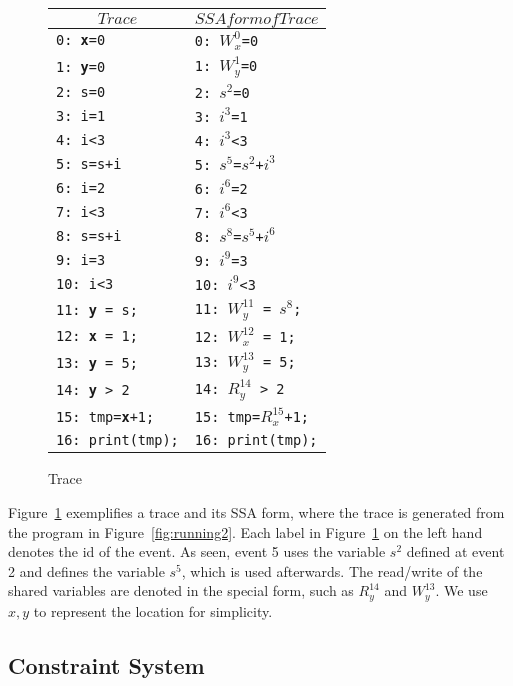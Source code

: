  
\begin{figure}
\centering
\begin{tabular}{l|l}
\hline
\multicolumn{1}{c}{$Trace$} & \multicolumn{1}{c}{$SSA form of  Trace$} \\
\hline
{\tt 0: {\bf x}=0} &  {\tt 0: $W^0_x$=0}    \\
{\tt 1: {\bf y}=0} &   {\tt 1: $W^1_y$=0}   \\
{\tt 2: s=0} &  {\tt 2: $s^2$=0}   \\
{\tt 3: i=1} &     {\tt 3: $i^3$=1}   \\
{\tt 4: i<3} &    {\tt 4: $i^3$<3} \\
{\tt 5: s=s+i} & {\tt 5: $s^5$=$s^2$+$i^3$}   \\
{\tt 6: i=2} &       {\tt 6: $i^6$=2}  \\
{\tt 7: i<3} &      {\tt 7: $i^6$<3}  \\
{\tt 8: s=s+i} &  {\tt 8: $s^8$=$s^5$+$i^6$}  \\
{\tt 9: i=3} &     {\tt 9: $i^9$=3}  \\
{\tt 10: i<3} &    {\tt 10: $i^9$<3}  \\
{\tt 11: {\bf y} = s;} &  {\tt 11: $W^{11}_y$ = $s^8$;}  \\
{\tt 12: {\bf x} = 1;} &    {\tt 12: $W^{12}_x$ = 1;}   \\
{\tt 13: {\bf y} = 5;} &    {\tt 13: $W^{13}_y$ = 5;}  \\
{\tt 14: {\bf y} > 2}  &    {\tt 14: $R^{14}_y$ > 2} \\
{\tt 15: tmp={\bf x}+1;}  & {\tt 15: tmp=$R^{15}_x$+1;}   \\	
{\tt 16: print(tmp);} &  {\tt 16: print(tmp);}  \\
\end{tabular}
\caption{Trace}
\label{fig:t4running2}
\end{figure}

Figure~\ref{fig:t4running2} exemplifies a trace and its SSA form, where the trace is generated from the program in Figure~\ref{fig:running2}.
Each label in  Figure~\ref{fig:t4running2} on the left hand denotes the id of the event. As seen, event 5 uses the variable $s^2$ defined at event 2 and defines the variable $s^5$, which is used afterwards. The read/write of the shared variables are denoted in the special form, such as $R^{14}_y$ and $W^{13}_y$. We use $x, y$ to represent the location for simplicity.




\subsection{Constraint System}

